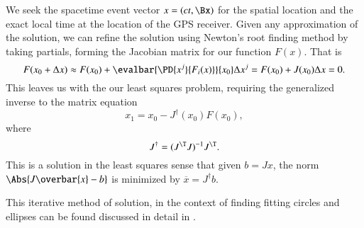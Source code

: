 We seek the spacetime event vector \(x = (c t, \Bx)\) for the spatial location and the exact local time at the location of the GPS receiver.  Given any approximation of the solution, we can refine the solution using Newton's root finding method by taking partials, forming the Jacobian matrix for our function \(F(x)\).  That is
\begin{equation}\label{eqn:relativisticElectrodynamicsA1:320}
F(x_0 + \Delta x) \approx F(x_0) + \evalbar{\PD{x^j}{F_i(x)}}{x_0} \Delta x^j = F(x_0) + J(x_0) \Delta x = 0.
\end{equation}
This leaves us with the our least squares problem, requiring the generalized inverse to the matrix equation
\begin{equation}\label{eqn:relativisticElectrodynamicsA1:330}
x_1 = x_0 - J^\dagger (x_0) F(x_0),
\end{equation}
where 
\begin{equation}\label{eqn:relativisticElectrodynamicsA1:340}
J^\dagger = (J^\T J)^{-1} J^\T.
\end{equation}
This is a solution in the least squares sense that given \(b = J x\), the norm \(\Abs{ J \overbar{x} - b}\) is minimized by \(\overbar{x} = J^\dagger b\).

This iterative method of solution, in the context of finding fitting circles and ellipses can be found discussed in detail in \citep{gander1994least}.

